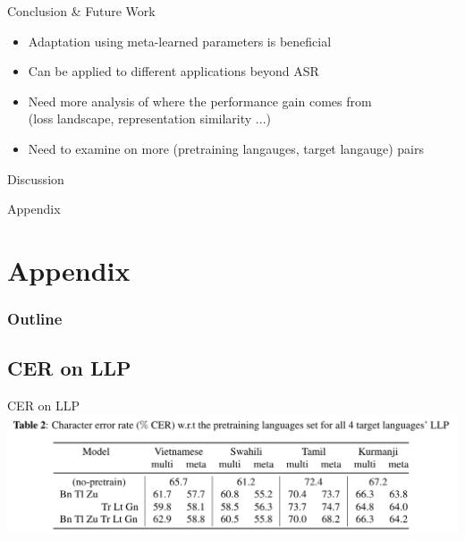 \documentclass{beamer}
\begin{document}
\begin{frame}[t]{Conclusion \& Future Work}
  \begin{itemize}
    \item Adaptation using meta-learned parameters is beneficial
    \item Can be applied to different applications beyond ASR
    \item Need more analysis of where the performance gain comes from \\ (loss landscape, representation similarity ...) $\qquad \qquad$ \hyperlink{losslandscape}{}
    \item Need to examine on more (pretraining langauges, target langauge) pairs
  \end{itemize}
\end{frame}

\begin{frame}
	\begin{center}
    \LARGE{Discussion}
	\end{center}
\end{frame}




\begin{frame}
	\begin{center}
    \LARGE{Appendix}
	\end{center}
\end{frame}

\section{Appendix}
\begin{frame}
\frametitle{Outline}
\tableofcontents
\end{frame}

\subsection{CER on LLP}
\begin{frame}[t]{CER on LLP}
  \center \includegraphics[width=1.0\textwidth]{fig/llp_table.png}
\end{frame}
\end{document}
